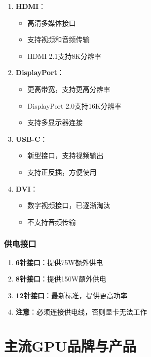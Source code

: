 \documentclass[12pt,UTF8]{ctexbook}
\begin{document}
\begin{enumerate}
    \item \textbf{HDMI}：
    \begin{itemize}[leftmargin=2em]
        \item 高清多媒体接口
        \item 支持视频和音频传输
        \item HDMI 2.1支持8K分辨率
    \end{itemize}
    
    \item \textbf{DisplayPort}：
    \begin{itemize}[leftmargin=2em]
        \item 更高带宽，支持更高分辨率
        \item DisplayPort 2.0支持16K分辨率
        \item 支持多显示器连接
    \end{itemize}
    
    \item \textbf{USB-C}：
    \begin{itemize}[leftmargin=2em]
        \item 新型接口，支持视频输出
        \item 支持正反插，方便使用
    \end{itemize}
    
    \item \textbf{DVI}：
    \begin{itemize}[leftmargin=2em]
        \item 数字视频接口，已逐渐淘汰
        \item 不支持音频传输
    \end{itemize}
\end{enumerate}

\section{供电接口}

\begin{enumerate}
    \item \textbf{6针接口}：提供75W额外供电
    \item \textbf{8针接口}：提供150W额外供电
    \item \textbf{12针接口}：最新标准，提供更高功率
    \item \textbf{注意}：必须连接供电线，否则显卡无法工作
\end{enumerate}

\part{主流GPU品牌与产品}
\end{document}
